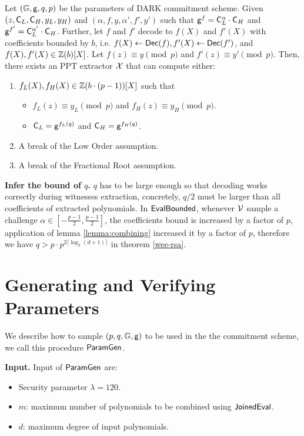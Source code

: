 \begin{lemma}
\label{lemma:combining}
Let $(\mathbb{G}, \mathsf{g}, q, p)$ be the parameters of DARK commitment scheme. Given $(z, \mathsf{C}_L, \mathsf{C}_H, y_L, y_H)$ and $(\alpha, f, y, \alpha', f', y')$ such that $\mathsf{g}^f = \mathsf{C}_L^\alpha \cdot \mathsf{C}_H$ and $\mathsf{g}^{f'} = \mathsf{C}_L^{\alpha'} \cdot \mathsf{C}_H$. Further, let $f$ and $f'$ decode to $f(X)$ and $f'(X)$ with coefficients bounded by $b$, i.e. $f(X) \gets \mathsf{Dec}(f), f'(X) \gets \mathsf{Dec}(f')$, and $f(X), f'(X) \in \mathbb{Z}(b)[X]$. Let $f(z) \equiv y \pmod p$ and $f'(z) \equiv y' \pmod p$. Then, there exists an PPT extractor $\mathcal{X}$ that can compute either:
\begin{enumerate}
    \item $f_L(X), f_H(X) \in \mathbb{Z}(b \cdot (p-1))[X]$ such that
    \begin{itemize}
        \item $f_L(z) \equiv y_L \pmod p$ and $f_H(z) \equiv y_H \pmod p$.
        \item $\mathsf{C}_L = \mathsf{g}^{f_L(q)}$ and $\mathsf{C}_H = \mathsf{g}^{f_H(q)}$.
    \end{itemize}
    \item A break of the Low Order assumption.
    \item A break of the Fractional Root assumption.
\end{enumerate}
\end{lemma}

\textbf{Infer the bound of $q$.} $q$ has to be large enough so that decoding works correctly during witnesses extraction, concretely, $q/2$ must be larger than all coefficients of extracted polynomials. In $\mathsf{EvalBounded}$, whenever $\mathcal{V}$ sample a challenge $\alpha \in [-\frac{p-1}{2}, \frac{p-1}{2}]$, the coefficients bound is increased by a factor of $p$, application of lemma \ref{lemma:combining} increased it by a factor of $p$, therefore we have $q > p \cdot p^{2 \lceil \log_2 (d+1) \rceil}$ in theorem \ref{wee-rsa}. 

\section{Generating and Verifying Parameters}

We describe how to sample $(p, q, \mathbb{G}, \mathsf{g})$ to be used in the the commitment scheme, we call this procedure $\mathsf{ParamGen}$.

\textbf{Input.} Input of $\mathsf{ParamGen}$ are:
\begin{itemize}
    \item Security parameter $\lambda = 120$.
    \item $m$: maximum number of polynomials to be combined using $\mathsf{JoinedEval}$.
    \item $d$: maximum degree of input polynomials.
\end{itemize}

